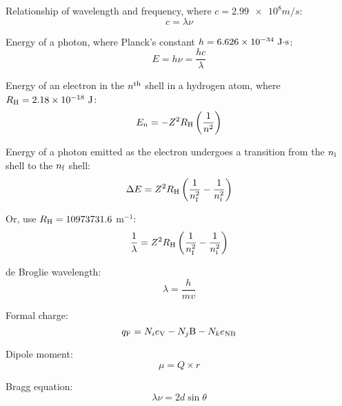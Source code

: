\documentclass[10pt]{article}
\begin{document}
Relationship of wavelength and frequency, where $c=\num{2.99e8}\unit{m/s}$:
\begin{equation*}
c = \lambda\nu
\end{equation*}

Energy of a photon, where Planck's constant $h=\num{6.626e-34}\textnormal{ J$\cdot$s}$:
\begin{equation*}
E = h\nu = \frac{hc}{\lambda}
\end{equation*}

Energy of an electron in the $n^{\textnormal{th}}$ shell in a hydrogen atom, where $R_\textnormal{H}=\num{2.18e-18}\textnormal{ J}$:
\begin{equation*}
E_n=-Z^2R_\textnormal{H}\left(\frac{1}{n^2}\right)
\end{equation*}

Energy of a photon emitted as the electron undergoes a transition from the $n_\textnormal{i}$ shell to the $n_\textnormal{f}$ shell:
\begin{equation*}
\Delta E = Z^2R_\textnormal{H}\left(\frac{1}{n_\textnormal{f}^2}-\frac{1}{n_\textnormal{i}^2}\right)
\end{equation*}

Or, use $R_\textnormal{H} = 10973731.6$ m$^{-1}$:
\begin{equation*}
\frac{1}{\lambda} = Z^2R_\textnormal{H}\left(\frac{1}{n_\textnormal{f}^2}-\frac{1}{n_\textnormal{i}^2}\right)
\end{equation*}

de Broglie wavelength:
\begin{equation*}
\lambda=\frac{h}{mv}
\end{equation*}

Formal charge:
\begin{equation*}
q_\textnormal{F} = N_ie_\textnormal{V} - N_j\textnormal{B} - N_ke_\textnormal{NB} 
\end{equation*}

Dipole moment:
\begin{equation*}
\mu = Q\times r
\end{equation*}

Bragg equation:
\begin{equation*}
\lambda\nu = 2d \sin \theta
\end{equation*}

\newpage
\end{document}
